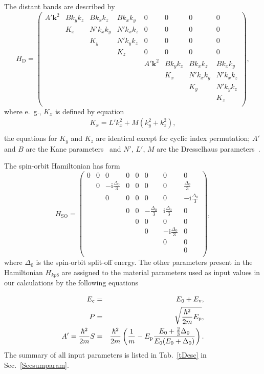 The distant bands are described by
%
\begin{equation}
H_\mathrm{D}=
\begin{pmatrix}
A'\mathbf{k}^2& Bk_yk_z& Bk_xk_z& Bk_xk_y& 0& 0& 0& 0\\
& K_x& N'k_xk_y& N'k_xk_z& 0& 0& 0& 0\\
& & K_y& N'k_yk_z& 0& 0& 0& 0\\
& & & K_z& 0& 0& 0& 0\\
& & & & A'\mathbf{k}^2& Bk_yk_z& Bk_xk_z& Bk_xk_y\\
& & & & & K_x& N'k_xk_y& N'k_xk_z\\
& & & & & & K_y& N'k_yk_z\\
& & & & & & & K_z\\
\end{pmatrix},
\end{equation}
where e.~g., $K_x$ is defined by equation
\begin{eqnarray*}
	K_x=L'k_x^2+M(k_y^2+k_z^2),\nonumber\\
\end{eqnarray*}
the equations for $K_y$ and $K_z$ are identical except for cyclic index permutation; $A'$ and $B$ are the Kane parameters~\citep{Kane} and $N'$, $L'$, $M$ are the Dresselhaus parameters~\citep{Dress}.

The spin-orbit Hamiltonian has form
\begin{equation}
H_\mathrm{SO}=
\begin{pmatrix}
0& 0& 0& 0& 0& 0& 0& 0\\
& 0& -\mathrm{i}\frac{\Delta_0}{3}& 0& 0& 0& 0& \frac{\Delta_0}{3}\\
& & 0& 0& 0& 0& 0& -\mathrm{i}\frac{\Delta_0}{3}\\
& & & 0& 0& -\frac{\Delta_0}{3}& \mathrm{i}\frac{\Delta_0}{3}& 0\\
& & & & 0& 0& 0& 0\\
& & & & & 0& -\mathrm{i}\frac{\Delta_0}{3}& 0\\
& & & & & & 0& 0\\
& & & & & & & 0\\
\end{pmatrix},
\end{equation}
where $\Delta_0$ is the spin-orbit split-off energy. The other parameters present in the Hamiltonian $H_{kp8}$ are assigned to the material parameters used as input values in our calculations by the following equations

\begin{eqnarray}
E_{\rm c}&=&E_0+E_{\rm v},\nonumber\\
P&=&\sqrt{\frac{\hbar^2}{2m}E_{\rm p}},\nonumber\\
A'=\frac{\hbar^2}{2m}S&=&\frac{\hbar^2}{2m}\left(\frac{1}{m}-E_{\rm p}\frac{E_0+\frac{2}{3}\Delta_0}{E_0(E_0+\Delta_0)}\right).\nonumber\\
\end{eqnarray}
{\noindent The summary of all input parameters is listed in Tab.~\ref{tDesc} in Sec.~\ref{Secsumparam}.}
 

